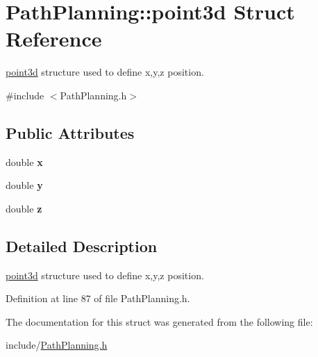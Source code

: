 \hypertarget{struct_path_planning_1_1point3d}{}\section{Path\+Planning\+:\+:point3d Struct Reference}
\label{struct_path_planning_1_1point3d}


\hyperlink{struct_path_planning_1_1point3d}{point3d} structure used to define x,y,z position.  




{\ttfamily \#include $<$Path\+Planning.\+h$>$}

\subsection*{Public Attributes}
\begin{DoxyCompactItemize}
\item 
double {\bfseries x}\hypertarget{struct_path_planning_1_1point3d_ad466c1c14a0a9f46e4250232911c3a22}{}\label{struct_path_planning_1_1point3d_ad466c1c14a0a9f46e4250232911c3a22}

\item 
double {\bfseries y}\hypertarget{struct_path_planning_1_1point3d_ac982acce7e5e7e3e705085f9f54660a4}{}\label{struct_path_planning_1_1point3d_ac982acce7e5e7e3e705085f9f54660a4}

\item 
double {\bfseries z}\hypertarget{struct_path_planning_1_1point3d_a1d78cdea1838df4926c6a4f7eac63f39}{}\label{struct_path_planning_1_1point3d_a1d78cdea1838df4926c6a4f7eac63f39}

\end{DoxyCompactItemize}


\subsection{Detailed Description}
\hyperlink{struct_path_planning_1_1point3d}{point3d} structure used to define x,y,z position. 

Definition at line 87 of file Path\+Planning.\+h.



The documentation for this struct was generated from the following file\+:\begin{DoxyCompactItemize}
\item 
include/\hyperlink{_path_planning_8h}{Path\+Planning.\+h}\end{DoxyCompactItemize}
